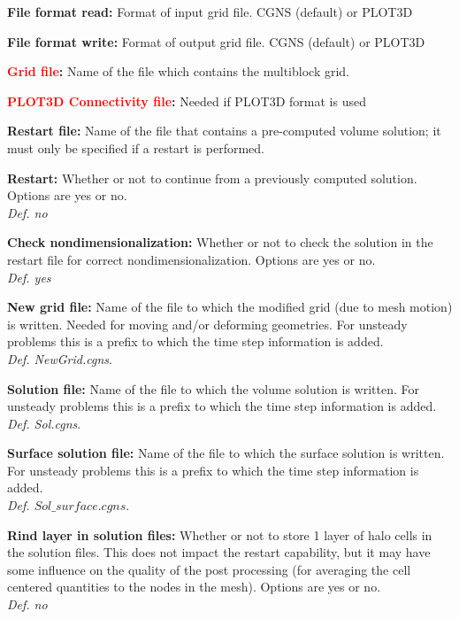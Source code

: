 \documentclass[12pt,epsf,colordvi]{article}
\begin{document}
\begin{description}
%
\item{\bf File format read:} Format of input grid file. CGNS (default) or PLOT3D
%
\item{\bf File format write:} Format of output grid file. CGNS (default) or PLOT3D
%
    \item{  \bf \textcolor{red}{ Grid file}:  }  Name of the file which contains the multiblock grid.
%
    \item{  \bf \textcolor{red}{PLOT3D Connectivity file}: } Needed if PLOT3D format is used
%
    \item{ \bf Restart file:}   Name of the file that contains a pre-computed volume solution; it must only be specified if a restart is performed.
%
   \item{\bf  Restart:} Whether or not to continue from a previously computed solution. Options are yes or no.\\ 
	{\it Def. no} 
%
   \item{ \bf Check nondimensionalization:}  Whether or not to check the solution in the restart file for correct nondimensionalization. Options are yes or no.\\ 
	{\it Def. yes}
%
   \item{ \bf New grid file:} Name of the file to which the modified grid (due to mesh motion) is written. Needed for moving and/or deforming geometries. For unsteady problems this is a prefix to which the time step information is added.\\ 
	{\it Def. NewGrid.cgns}.
%
   \item{\bf Solution file: } Name of the file to which the volume solution is written. For unsteady problems this is a prefix to which the time step information is added.\\ 
	{\it Def. Sol.cgns}.
%
    \item{\bf Surface solution file:} Name of the file to which the surface solution is written. For unsteady problems this is a prefix to which the time step information is added. \\ 
	{\it Def. \(Sol\_surface.cgns\)}.
%
     \item{\bf Rind layer in solution files: } Whether or not to store 1 layer of halo cells in the solution files. This does not impact the restart capability, but it may have some influence on the quality of the post processing (for averaging the cell centered quantities to the nodes in the mesh). Options are yes or no. \\ 
	{\it Def. no}\\  

\end{description}
\end{document}
